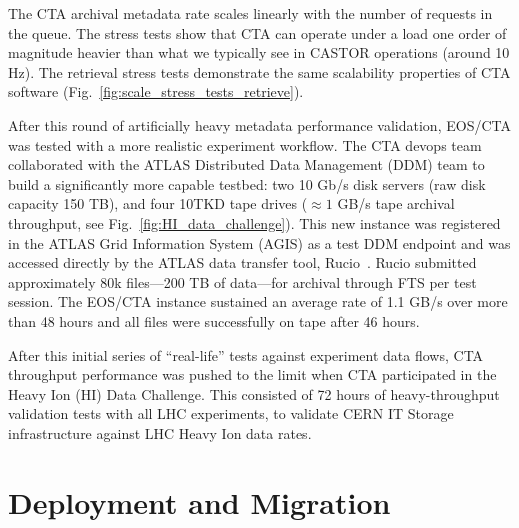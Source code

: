 \documentclass{webofc}
\begin{document}
The CTA archival metadata rate scales linearly with the number of requests in the queue. The stress tests 
show that CTA can operate under a load one order of magnitude heavier than what we typically see
in CASTOR operations (around 10 Hz). The retrieval stress tests demonstrate
the same scalability properties of CTA software (Fig.~\ref{fig:scale_stress_tests_retrieve}).

After this round of artificially heavy metadata performance validation, EOS/CTA was tested with a more
realistic experiment workflow. The CTA devops team collaborated with the ATLAS Distributed Data Management (DDM)
team to build a significantly more capable testbed: two 10 Gb/s disk servers (raw disk capacity 150 TB),
and four 10TKD tape drives ($\approx1$ GB/s tape archival throughput, see Fig.~\ref{fig:HI_data_challenge}).
This new instance was registered in the ATLAS Grid Information System (AGIS) as a test DDM endpoint and was accessed directly by the ATLAS data transfer tool,
Rucio~\cite{rucio}. Rucio submitted approximately 80k files---200 TB of data---for archival through FTS per test session. The
EOS/CTA instance sustained an average rate of 1.1 GB/s over more than 48 hours and all files were successfully
on tape after 46 hours.

After this initial series of ``real-life'' tests against experiment data flows, CTA throughput performance
was pushed to the limit when CTA participated in the Heavy Ion (HI) Data Challenge.
This consisted of 72 hours of heavy-throughput validation tests with all LHC experiments, to validate CERN IT
Storage infrastructure against LHC Heavy Ion data rates.


\section{Deployment and Migration}
\label{Deployment_and_Migration}
\end{document}
